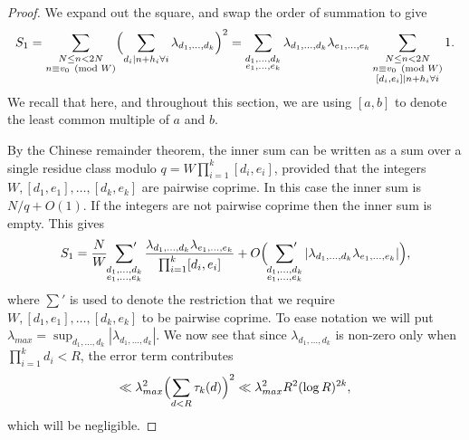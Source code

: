 \documentclass[12pt,a4paper]{amsart}
\theoremstyle{plain}
\numberwithin{sblmm}{thrm}
\numberwithin{equation}{section}
\begin{document}
\begin{proof}
We expand out the square, and swap the order of summation to give\begin{equation}S_1=\sum_{\substack{N\le n<2N\\ n\equiv v_0\pmod{W}}}\Bigl(\sum_{d_i|n+h_i\forall i}\lambda_{d_1,\dotsc,d_k}\Bigr)^2=\sum_{\substack{d_1,\dotsc, d_k\\e_1,\dotsc, e_k}}\lambda_{d_1,\dotsc,d_k}\lambda_{e_1,\dotsc,e_k}\sum_{\substack{N\le n<2N\\ n\equiv v_0\pmod{W}\\ [d_i,e_i]|n+h_i \forall i}}1.
\end{equation}
We recall that here, and throughout this section,  we are using $[a,b]$ to denote the least common multiple of $a$ and $b$.

By the Chinese remainder theorem, the inner sum can be written as a sum over a single residue class modulo $q=W\prod_{i=1}^k[d_i,e_i]$, provided that the integers $W,[d_1,e_1],\dotsc, [d_k,e_k]$ are pairwise coprime. In this case the inner sum is $N/q+O(1)$. If the integers are not pairwise coprime then the inner sum is empty. This gives
\begin{align}
S_1=\frac{N}{W}\sideset{}{'}\sum_{\substack{d_1,\dotsc,d_k\\e_1,\dotsc,e_k}}\frac{\lambda_{d_1,\dotsc,d_k}\lambda_{e_1,\dotsc,e_k}}{\prod_{i=1}^k[d_i,e_i]}+O\Bigl(\sideset{}{'}\sum_{\substack{d_1,\dotsc,d_k\\e_1,\dotsc,e_k}}|\lambda_{d_1,\dotsc,d_k}\lambda_{e_1,\dotsc,e_k}|\Bigr),
\end{align}
where $\sum'$ is used to denote the restriction that we require $W, [d_1,e_1], \dotsc ,  [d_k,e_k]$ to be pairwise coprime. To ease notation we will put $\lambda_{max}=\sup_{d_1,\dotsc, d_k}|\lambda_{d_1,\dotsc,d_k}|$. We now see that since $\lambda_{d_1,\dotsc,d_k}$ is non-zero only when $\prod_{i=1}^kd_i<R$, the error term contributes
\begin{equation}\ll \lambda_{max}^2\Bigl(\sum_{d<R}\tau_k(d)\Bigr)^2\ll \lambda_{max}^2R^2(\log{R})^{2k},\end{equation}
which will be negligible.


\end{proof}
\end{document}

